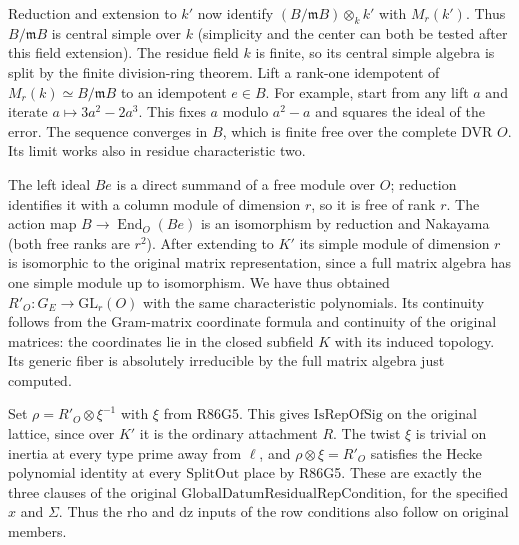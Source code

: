 Reduction and extension to $k'$ now identify
$(B/\mathfrak m B)\otimes_k k'$ with $M_r(k')$. Thus
$B/\mathfrak m B$ is central simple over $k$ (simplicity and
the center can both be tested after this field extension).
The residue field $k$ is finite, so its central simple algebra
is split by the finite division-ring theorem. Lift a rank-one
idempotent of $M_r(k)\simeq B/\mathfrak m B$ to an idempotent
$e\in B$. For example, start from any lift $a$ and iterate
$a\mapsto 3a^2-2a^3$. This fixes $a$ modulo $a^2-a$ and
squares the ideal of the error. The sequence converges in $B$,
which is finite free over the complete DVR $O$. Its limit works
also in residue characteristic two.

The left ideal $Be$ is a direct summand of a free module over
$O$; reduction identifies it with a column module of dimension
$r$, so it is free of rank $r$. The action map
$B\to\operatorname{End}_O(Be)$ is an isomorphism by reduction
and Nakayama (both free ranks are $r^2$). After extending to
$K'$ its simple module of dimension $r$ is isomorphic to the
original matrix representation, since a full matrix algebra
has one simple module up to isomorphism. We have thus obtained
$R'_O:G_E\to\mathrm{GL}_r(O)$ with the same characteristic
polynomials. Its continuity follows from the Gram-matrix
coordinate formula and continuity of the original matrices:
the coordinates lie in the closed subfield $K$ with its induced
topology. Its generic fiber is absolutely irreducible by the
full matrix algebra just computed.

Set $\rho=R'_O\otimes\xi^{-1}$ with $\xi$ from R86G5.
This gives $\mathrm{IsRepOfSig}$ on the original lattice, since
over $K'$ it is the ordinary attachment $R$. The twist $\xi$
is trivial on inertia at every type prime away from $\ell$,
and $\rho\otimes\xi=R'_O$ satisfies the Hecke polynomial
identity at every $\mathrm{SplitOut}$ place by R86G5.
These are exactly the three clauses of the original
$\mathrm{GlobalDatumResidualRepCondition}$, for the specified
$x$ and $\Sigma$. Thus the $\mathrm{rho}$ and $\mathrm{dz}$
inputs of the row conditions also follow on original members.
